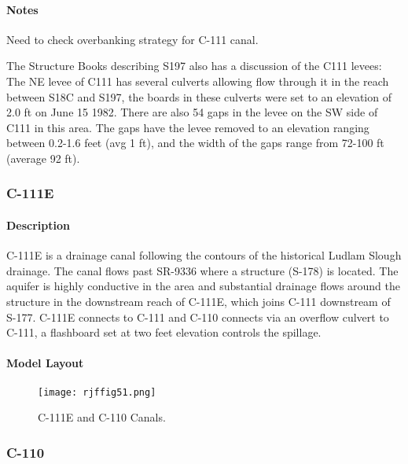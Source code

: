 \begin{notes}
\paragraph{Notes}
Need to check overbanking strategy for C-111 canal.


The Structure Books describing S197 also has a discussion of the C111 levees: The NE levee of C111 has several culverts allowing flow through it in the reach between S18C and S197, the boards in these culverts were set to an elevation of 2.0 ft on June 15 1982. There are also 54 gaps in the levee on the SW side of C111 in this area. The gaps have the levee removed to an elevation ranging between 0.2-1.6 feet (avg 1 ft), and the width of the gaps range from 72-100 ft (average  92 ft).
\end{notes}

\clearpage
\subsubsection{C-111E}
\paragraph{Description}
C-111E is a drainage canal following the contours of the historical Ludlam Slough drainage. The canal flows past SR-9336 where a structure (S-178) is located. The aquifer is highly conductive in the area and substantial drainage flows around the structure in the downstream reach of C-111E, which joins C-111 downstream of S-177. C-111E connects to C-111 and C-110 connects via an overflow culvert to C-111, a flashboard set at two feet elevation controls the spillage.

\paragraph{Model Layout}

\begin{figure}[!h]
  \begin{center}
  \texttt{[image: rjffig51.png]}
  \caption{C-111E and C-110 Canals.}
  \label{fig:rjffig51}
  \end{center}
\end{figure}


\clearpage
\subsubsection{C-110}
